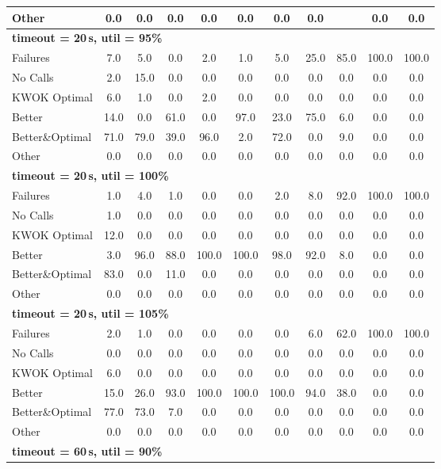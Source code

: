\begin{tabular}{l cccccccccc}
Other & 0.0 & 0.0 & 0.0 & 0.0 & 0.0 & 0.0 & 0.0 & \text{--} & 0.0 & 0.0 \\
\midrule
\multicolumn{11}{l}{\textbf{timeout = 20\,s, util = 95\%}} \\
\midrule
Failures & 7.0 & 5.0 & 0.0 & 2.0 & 1.0 & 5.0 & 25.0 & 85.0 & 100.0 & 100.0 \\
No Calls & 2.0 & 15.0 & 0.0 & 0.0 & 0.0 & 0.0 & 0.0 & 0.0 & 0.0 & 0.0 \\
KWOK Optimal & 6.0 & 1.0 & 0.0 & 2.0 & 0.0 & 0.0 & 0.0 & 0.0 & 0.0 & 0.0 \\
Better & 14.0 & 0.0 & 61.0 & 0.0 & 97.0 & 23.0 & 75.0 & 6.0 & 0.0 & 0.0 \\
Better\&Optimal & 71.0 & 79.0 & 39.0 & 96.0 & 2.0 & 72.0 & 0.0 & 9.0 & 0.0 & 0.0 \\
Other & 0.0 & 0.0 & 0.0 & 0.0 & 0.0 & 0.0 & 0.0 & 0.0 & 0.0 & 0.0 \\
\midrule
\multicolumn{11}{l}{\textbf{timeout = 20\,s, util = 100\%}} \\
\midrule
Failures & 1.0 & 4.0 & 1.0 & 0.0 & 0.0 & 2.0 & 8.0 & 92.0 & 100.0 & 100.0 \\
No Calls & 1.0 & 0.0 & 0.0 & 0.0 & 0.0 & 0.0 & 0.0 & 0.0 & 0.0 & 0.0 \\
KWOK Optimal & 12.0 & 0.0 & 0.0 & 0.0 & 0.0 & 0.0 & 0.0 & 0.0 & 0.0 & 0.0 \\
Better & 3.0 & 96.0 & 88.0 & 100.0 & 100.0 & 98.0 & 92.0 & 8.0 & 0.0 & 0.0 \\
Better\&Optimal & 83.0 & 0.0 & 11.0 & 0.0 & 0.0 & 0.0 & 0.0 & 0.0 & 0.0 & 0.0 \\
Other & 0.0 & 0.0 & 0.0 & 0.0 & 0.0 & 0.0 & 0.0 & 0.0 & 0.0 & 0.0 \\
\midrule
\multicolumn{11}{l}{\textbf{timeout = 20\,s, util = 105\%}} \\
\midrule
Failures & 2.0 & 1.0 & 0.0 & 0.0 & 0.0 & 0.0 & 6.0 & 62.0 & 100.0 & 100.0 \\
No Calls & 0.0 & 0.0 & 0.0 & 0.0 & 0.0 & 0.0 & 0.0 & 0.0 & 0.0 & 0.0 \\
KWOK Optimal & 6.0 & 0.0 & 0.0 & 0.0 & 0.0 & 0.0 & 0.0 & 0.0 & 0.0 & 0.0 \\
Better & 15.0 & 26.0 & 93.0 & 100.0 & 100.0 & 100.0 & 94.0 & 38.0 & 0.0 & 0.0 \\
Better\&Optimal & 77.0 & 73.0 & 7.0 & 0.0 & 0.0 & 0.0 & 0.0 & 0.0 & 0.0 & 0.0 \\
Other & 0.0 & 0.0 & 0.0 & 0.0 & 0.0 & 0.0 & 0.0 & 0.0 & 0.0 & 0.0 \\
\midrule
\multicolumn{11}{l}{\textbf{timeout = 60\,s, util = 90\%}} \\

\end{tabular}
